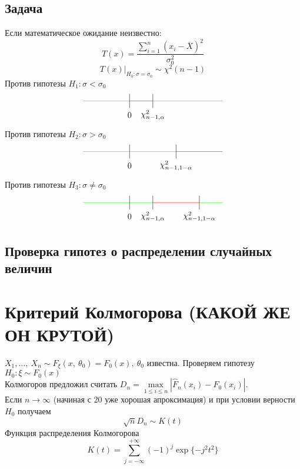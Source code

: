 \documentclass[12pt, a4paper]{article}
\begin{document}
\subsection*{Задача}
Если математическое ожидание неизвестно:
\[T(x) = \frac{\sum_{i = 1}^{n} (x_i - \overline{X})^2}{\sigma_0^2}\]
\[T(x) \big|_{H_0: \sigma = \sigma_0} \sim \chi^2(n - 1)\]
Против гипотезы $H_1: \sigma < \sigma_0$
\[\begin{tikzpicture}[scale=2]
    \draw[green] (-1, 0) -- (0, 0);
    \draw[red] (0, 0) -- (0.5, 0);
    \draw[green] (0.5, 0) -- (2, 0);
    \draw (0, -0.15) -- ++(0, 0.3);
    \node at (0, -0.3) (a) {$0$};
    \draw (0.5, -0.15) -- ++(0, 0.3);
    \node at (0.5, -0.3) (a) {$\chi^2_{n - 1, \alpha}$};
\end{tikzpicture}\]
Против гипотезы $H_2: \sigma > \sigma_0$
\[\begin{tikzpicture}[scale=2]
    \draw[green] (-1, 0) -- (0, 0);
    \draw[green] (0, 0) -- (1, 0);
    \draw[red] (1, 0) -- (2, 0);
    \draw (0, -0.15) -- ++(0, 0.3);
    \node at (0, -0.3) (a) {$0$};
    \draw (1, -0.15) -- ++(0, 0.3);
    \node at (1, -0.3) (a) {$\chi^2_{n - 1, 1 - \alpha}$};
\end{tikzpicture}\]
Против гипотезы $H_3: \sigma \neq \sigma_0$
\[\begin{tikzpicture}[scale=2]
    \draw[green] (-1, 0) -- (0, 0);
    \draw[green] (0, 0) -- (0.5, 0);
    \draw[green] (1.5, 0) -- ++(0.5, 0);
    \draw[red] (0.5, 0) -- (1.5, 0);
    \draw (0, -0.15) -- ++(0, 0.3);
    \node at (0, -0.3) (a) {$0$};
    \draw (0.5, -0.15) -- ++(0, 0.3);
    \draw (1.5, -0.15) -- ++(0, 0.3);
    \node at (0.5, -0.3) (a) {$\chi^2_{n - 1, \alpha}$};
    \node at (1.5, -0.3) (a) {$\chi^2_{n - 1, 1 - \alpha}$};
\end{tikzpicture}\]
\subsection*{Проверка гипотез о распределении случайных величин}
\section*{Критерий Колмогорова (КАКОЙ ЖЕ ОН КРУТОЙ)}
$X_1,\dots,\ X_n \sim F_{\xi} (x,\ \theta_0) = F_0(x),\ \theta_0$ известна. Проверяем гипотезу $H_0: \xi \sim F_0(x)$\\
Колмогоров предложил считать $D_n = \max\limits_{1 \leq i \leq n} \left| \hat F_n (x_i) - F_0(x_i) \right|$.\\
Если $n\to \infty$ (начиная с 20 уже хорошая апроксимация) и при условии верности $H_0$ получаем 
\[\sqrt{n} D_n \sim K(t)\]
Функция распределения Колмогорова
\[K(t) = \sum_{j = -\infty}^{+\infty} (-1)^j \exp\{-j^2 t^2\}\]
\end{document}
